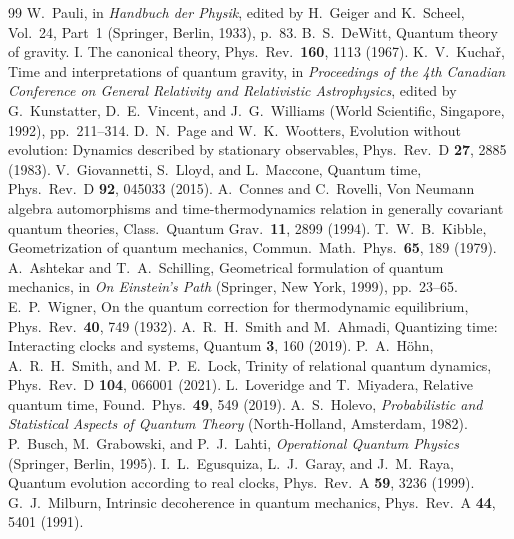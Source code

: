 \documentclass[aps,prd,onecolumn,notitlepage,10pt,amsmath,amssymb,amsfonts,nofootinbib]{revtex4-2}
\theoremstyle{definition}
\theoremstyle{remark}
\begin{document}
\begin{thebibliography}{99}
 W.~Pauli, in \emph{Handbuch der Physik}, edited by H.~Geiger and K.~Scheel, Vol.~24, Part~1 (Springer, Berlin, 1933), p.~83.
 B.~S.~DeWitt, Quantum theory of gravity. I. The canonical theory, Phys.\ Rev.\ \textbf{160}, 1113 (1967).
 K.~V.~Kucha\v{r}, Time and interpretations of quantum gravity, in \emph{Proceedings of the 4th Canadian Conference on General Relativity and Relativistic Astrophysics}, edited by G.~Kunstatter, D.~E.~Vincent, and J.~G.~Williams (World Scientific, Singapore, 1992), pp.~211--314.
 D.~N.~Page and W.~K.~Wootters, Evolution without evolution: Dynamics described by stationary observables, Phys.\ Rev.\ D \textbf{27}, 2885 (1983).
 V.~Giovannetti, S.~Lloyd, and L.~Maccone, Quantum time, Phys.\ Rev.\ D \textbf{92}, 045033 (2015).
 A.~Connes and C.~Rovelli, Von Neumann algebra automorphisms and time-thermodynamics relation in generally covariant quantum theories, Class.\ Quantum Grav.\ \textbf{11}, 2899 (1994).
 T.~W.~B.~Kibble, Geometrization of quantum mechanics, Commun.\ Math.\ Phys.\ \textbf{65}, 189 (1979).
 A.~Ashtekar and T.~A.~Schilling, Geometrical formulation of quantum mechanics, in \emph{On Einstein's Path} (Springer, New York, 1999), pp.~23--65.
 E.~P.~Wigner, On the quantum correction for thermodynamic equilibrium, Phys.\ Rev.\ \textbf{40}, 749 (1932).
 A.~R.~H.~Smith and M.~Ahmadi, Quantizing time: Interacting clocks and systems, Quantum \textbf{3}, 160 (2019).
 P.~A.~H\"ohn, A.~R.~H.~Smith, and M.~P.~E.~Lock, Trinity of relational quantum dynamics, Phys.\ Rev.\ D \textbf{104}, 066001 (2021).
 L.~Loveridge and T.~Miyadera, Relative quantum time, Found.\ Phys.\ \textbf{49}, 549 (2019).
 A.~S.~Holevo, \emph{Probabilistic and Statistical Aspects of Quantum Theory} (North-Holland, Amsterdam, 1982).
 P.~Busch, M.~Grabowski, and P.~J.~Lahti, \emph{Operational Quantum Physics} (Springer, Berlin, 1995).
 I.~L.~Egusquiza, L.~J.~Garay, and J.~M.~Raya, Quantum evolution according to real clocks, Phys.\ Rev.\ A \textbf{59}, 3236 (1999).
 G.~J.~Milburn, Intrinsic decoherence in quantum mechanics, Phys.\ Rev.\ A \textbf{44}, 5401 (1991).

\end{thebibliography}
\end{document}
